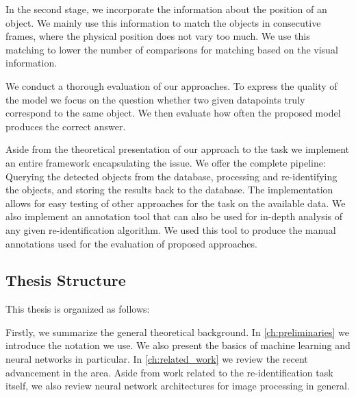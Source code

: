 In the second stage, we incorporate the information about the position of an object. We mainly use this information to match the objects in consecutive frames, where the physical position does not vary too much. We use this matching to lower the number of comparisons for matching based on the visual information.

We conduct a thorough evaluation of our approaches. To express the quality of the model we focus on the question whether two given datapoints truly correspond to the same object. We then evaluate how often the proposed model produces the correct answer.

Aside from the theoretical presentation of our approach to the \reid{} task we implement an entire framework encapsulating the issue. We offer the complete pipeline: Querying the detected objects from the database, processing and re-identifying the objects, and storing the results back to the database. The implementation allows for easy testing of other approaches for the \reid{} task on the available data. We also implement an annotation tool that can also be used for in-depth analysis of any given re-identification algorithm. We used this tool to produce the manual annotations used for the evaluation of proposed approaches.



\subsection*{Thesis Structure}

This thesis is organized as follows:

Firstly, we summarize the general theoretical background. In \autoref{ch:preliminaries} we introduce the notation we use. We also present the basics of machine learning and neural networks in particular. In \autoref{ch:related_work} we review the recent advancement in the area. Aside from work related to the re-identification task itself, we also review neural network architectures for image processing in general.


